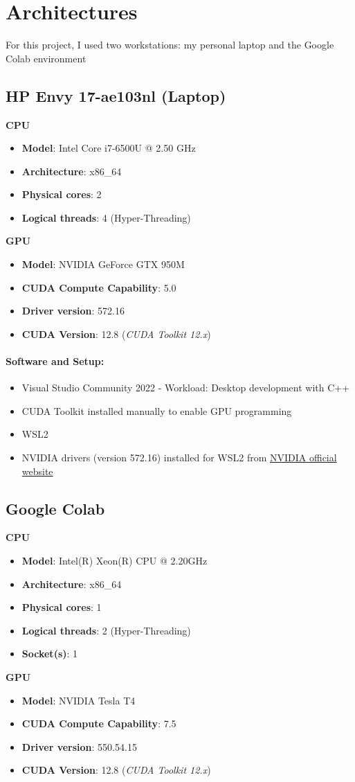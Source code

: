 \section{Architectures}
For this project, I used two workstations: my personal laptop and the Google Colab environment

\subsection{HP Envy 17-ae103nl (Laptop)}
\textbf{CPU}
\begin{itemize}
    \item \textbf{Model}: Intel Core i7-6500U @ 2.50 GHz
    \item \textbf{Architecture}: x86\_64
    \item \textbf{Physical cores}: 2
    \item \textbf{Logical threads}: 4 (Hyper-Threading)
\end{itemize}

\noindent
\textbf{GPU}
\begin{itemize}
    \item \textbf{Model}: NVIDIA GeForce GTX 950M
    \item \textbf{CUDA Compute Capability}: 5.0
    \item \textbf{Driver version}: 572.16
    \item \textbf{CUDA Version}: 12.8 (\textit{CUDA Toolkit 12.x})
\end{itemize}

\paragraph{Software and Setup:} 
\begin{itemize}
    \item Visual Studio Community 2022 - Workload: Desktop development with C++
    \item CUDA Toolkit installed manually to enable GPU programming
    \item WSL2
    \item NVIDIA drivers (version 572.16) installed for WSL2 from 
    \href{https://www.nvidia.com/it-it/geforce/drivers/results/240815/}{NVIDIA official website}
\end{itemize}


\subsection{Google Colab}
\textbf{CPU}
\begin{itemize}
    \item \textbf{Model}: Intel(R) Xeon(R) CPU @ 2.20GHz
    \item \textbf{Architecture}: x86\_64
    \item \textbf{Physical cores}: 1
    \item \textbf{Logical threads}: 2 (Hyper-Threading)
    \item \textbf{Socket(s)}: 1
\end{itemize}

\noindent
\textbf{GPU}
\begin{itemize}
    \item \textbf{Model}: NVIDIA Tesla T4
    \item \textbf{CUDA Compute Capability}: 7.5
    \item \textbf{Driver version}: 550.54.15
    \item \textbf{CUDA Version}: 12.8 (\textit{CUDA Toolkit 12.x})
\end{itemize}